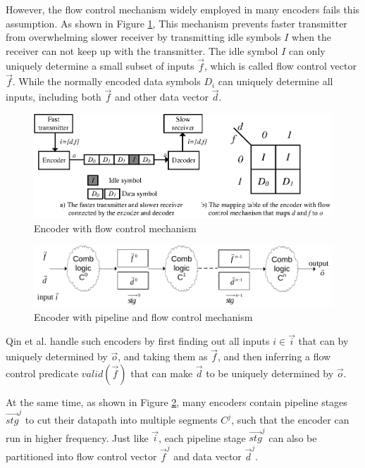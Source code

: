 \documentclass[runningheads,a4paper,orivec]{llncs}
\begin{document}
However,
the flow control mechanism \cite{flowcontrol} widely employed in many encoders
fails this assumption.
As shown in Figure \ref{fig_fc},
This mechanism prevents faster transmitter from overwhelming slower receiver
by transmitting idle symbols $I$ when the receiver can not keep up with the transmitter.
The idle symbol $I$
can only uniquely determine a small subset of inputs $\vec{f}$,
which is called flow control vector $\vec{f}$.
While the normally encoded data symbols $D_i$ can
uniquely determine all inputs, 
including both $\vec{f}$ and other data vector $\vec{d}$.

\begin{figure}[t]
\centering
\includegraphics[width=\textwidth]{nonuniq}
\caption{Encoder with flow control mechanism}
\label{fig_fc}
\end{figure}

\begin{figure}[b]
\centering
\includegraphics[width=\textwidth]{pipemod1}
\caption{Encoder with pipeline and flow control mechanism}
\label{pipemod}
\end{figure}

Qin et al. \cite{QinTODAES15} handle such encoders by
first finding out all inputs $i\in\vec{i}$ that can by uniquely determined by $\vec{o}$,
and taking them as $\vec{f}$,
and then inferring a flow control predicate $valid(\vec{f})$ that
can make $\vec{d}$ to be uniquely determined by $\vec{o}$.

At the same time,
as shown in Figure \ref{pipemod},
many encoders contain
pipeline stages $\vec{stg}^j$ to cut their datapath into multiple segments $C^j$,
such that the encoder can run in higher frequency.
Just like $\vec{i}$,
each pipeline stage $\vec{stg}^j$ can also be partitioned into flow control vector $\vec{f}^j$ and data vector $\vec{d}^j$.
\end{document}
